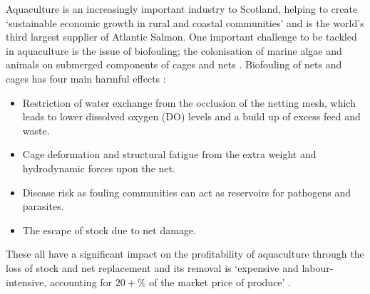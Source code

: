 \documentclass[11.5pt, twoside, a4paper]{article}
\begin{document}
Aquaculture is an increasingly important industry to Scotland, helping to create `sustainable economic growth in rural and coastal communities' \cite{ScotAqua} and is the world's third largest supplier of Atlantic Salmon. One important challenge to be tackled in aquaculture is the issue of biofouling; the colonisation of marine algae and animals on submerged components of cages and nets \cite{fitridge2012impact}. Biofouling of nets and cages has four main harmful effects \cite{fitridge2012impact, beveridge2008cage, Crown}:
\begin{itemize}
\item Restriction of water exchange from the occlusion of the netting mesh, which leads to lower dissolved oxygen (DO) levels and a build up of excess feed and waste. 
\item Cage deformation and structural fatigue from the extra weight and hydrodynamic forces upon the net.
\item Disease risk as fouling communities can act as reservoirs for pathogens and parasites.
\item The escape of stock due to net damage.
\end{itemize}
These all have a significant impact on the profitability of aquaculture through the loss of stock and net replacement and its removal is `expensive and labour-intensive, accounting for $20+\%$ of the market price of produce' \cite{Crown}. 
\end{document}
